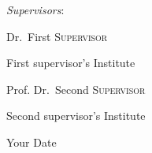 \documentclass[thesis]{subfiles}
\begin{document}
\begin{titlepage}
{    %
    } %
    \vspace{0.5cm}
    \par
    \raggedleft
	{\Large\itshape Supervisors}:\par\vspace{0.25cm}
	{\large Dr.~First \textsc{Supervisor}\par} %
    First supervisor's Institute\par %
    \vspace{0.25cm}
    {\large Prof. Dr.~Second \textsc{Supervisor}\par} %
    Second supervisor's Institute %

	\vfill
	{\large Your Date\par}%
    
\end{titlepage}    

\restoregeometry %
\end{document}
